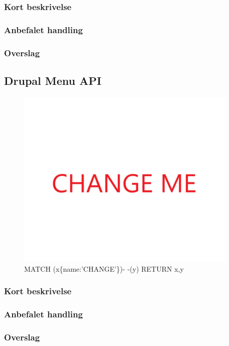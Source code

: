 \documentclass{article}
\begin{document}
\subsubsection{Kort beskrivelse}
\subsubsection{Anbefalet handling}
\subsubsection{Overslag}
\newpage{}
\clearpage
\subsection{Drupal Menu API}
\begin{figure}[h]
\includegraphics[width=300pt]{CHANGE.PNG}
\caption{MATCH (x\{name:'CHANGE'\})- -(y) RETURN x,y}
\end{figure}
\subsubsection{Kort beskrivelse}
\subsubsection{Anbefalet handling}
\subsubsection{Overslag}
\end{document}
